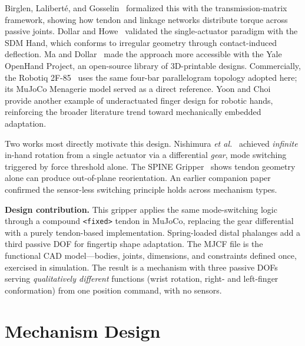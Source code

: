 \documentclass[10pt,twocolumn]{article}
\begin{document}
Birglen, Laliberté, and Gosselin~\cite{birglen2008} formalized this with the transmission-matrix framework, showing how tendon and linkage networks distribute torque across passive joints. Dollar and Howe~\cite{dollar2010} validated the single-actuator paradigm with the SDM Hand, which conforms to irregular geometry through contact-induced deflection. Ma and Dollar~\cite{ma2017} made the approach more accessible with the Yale OpenHand Project, an open-source library of 3D-printable designs. Commercially, the Robotiq 2F-85~\cite{robotiq2022} uses the same four-bar parallelogram topology adopted here; its MuJoCo Menagerie model served as a direct reference. Yoon and Choi~\cite{yoon2017} provide another example of underactuated finger design for robotic hands, reinforcing the broader literature trend toward mechanically embedded adaptation.

Two works most directly motivate this design. Nishimura \emph{et al.}~\cite{nishimura2022} achieved \emph{infinite} in-hand rotation from a single actuator via a differential \emph{gear}, mode switching triggered by force threshold alone. The SPINE Gripper~\cite{spine2026} shows tendon geometry alone can produce out-of-plane reorientation. An earlier companion paper~\cite{nishimura2021} confirmed the sensor-less switching principle holds across mechanism types.

\textbf{Design contribution.} This gripper applies the same mode-switching logic through a compound \texttt{<fixed>} tendon in MuJoCo, replacing the gear differential with a purely tendon-based implementation. Spring-loaded distal phalanges add a third passive DOF for fingertip shape adaptation. The MJCF file is the functional CAD model---bodies, joints, dimensions, and constraints defined once, exercised in simulation. The result is a mechanism with three passive DOFs serving \emph{qualitatively different} functions (wrist rotation, right- and left-finger conformation) from one position command, with no sensors.

\section{Mechanism Design}
\label{sec:design}
\end{document}
